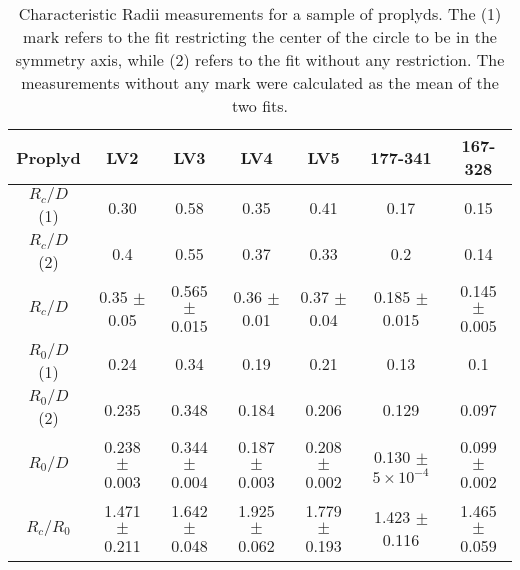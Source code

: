 \begin{table*}
\begin{tabular}{c|cccccc}\hline
Proplyd & LV2 & LV3 & LV4  & LV5 & 177-341 & 167-328 \\\hline
$R_c/D$ (1) & 0.30 & 0.58  & 0.35 & 0.41 & 0.17 & 0.15 \\
$R_c/D$ (2) & 0.4 & 0.55 & 0.37 & 0.33 & 0.2 & 0.14    \\
$R_c/D$     & 0.35 $\pm$ 0.05 & 0.565 $\pm$ 0.015 & 0.36  $\pm$ 0.01  & 0.37 $\pm$ 0.04 & 0.185 $\pm$ 0.015 & 0.145 $\pm$ 0.005 \\
$R_0/D$ (1) & 0.24 & 0.34 & 0.19 & 0.21 & 0.13 & 0.1 \\
$R_0/D$ (2) & 0.235 & 0.348  & 0.184 & 0.206 & 0.129 & 0.097 \\
$R_0/D$     & 0.238 $\pm$ 0.003 & 0.344 $\pm$ 0.004 & 0.187 $\pm$ 0.003 & 0.208 $\pm$ 0.002 & 0.130 $\pm$ $5\times 10^{-4}$ & 0.099 $\pm$ 0.002 \\
$R_c/R_0$ & 1.471 $\pm$ 0.211 & 1.642 $\pm$ 0.048 & 1.925 $\pm$ 0.062 & 1.779 $\pm$ 0.193 & 1.423 $\pm$ 0.116 & 1.465 $\pm$ 0.059 
\end{tabular}
\caption{Characteristic Radii measurements for a sample of proplyds. The (1) mark refers to the fit restricting
the center of the circle to be in the symmetry axis, while (2) refers to the fit without any restriction. The
measurements without any mark were calculated as the mean of the two
fits.} %

\label{tab:proplyds}
\end{table*}

